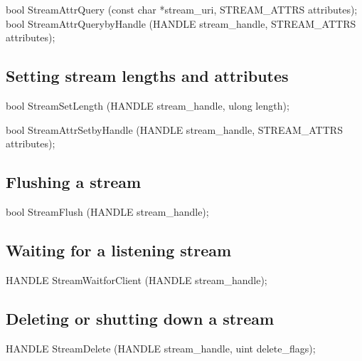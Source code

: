 \begin{paldef}
bool StreamAttrQuery (const char *stream_uri,
                      STREAM_ATTRS attributes);
bool StreamAttrQuerybyHandle (HANDLE stream_handle,
                              STREAM_ATTRS attributes);
\end{paldef}



\subsection*{Setting stream lengths and attributes}


\begin{paldef}
bool StreamSetLength (HANDLE stream_handle,
                      ulong length);
\end{paldef}


\begin{paldef}
bool StreamAttrSetbyHandle (HANDLE stream_handle,
                            STREAM_ATTRS attributes);
\end{paldef}




\subsection*{Flushing a stream}


\begin{paldef}
bool StreamFlush (HANDLE stream_handle);
\end{paldef}


\subsection*{Waiting for a listening stream}


\begin{paldef}
HANDLE StreamWaitforClient (HANDLE stream_handle);
\end{paldef} 


\subsection*{Deleting or shutting down a stream}


\begin{paldef}
HANDLE StreamDelete (HANDLE stream_handle,
                     uint delete_flags);
\end{paldef}